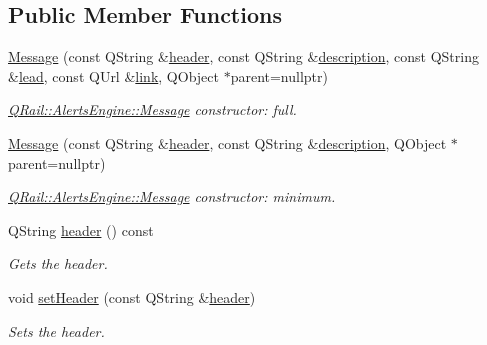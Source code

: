 \subsection*{Public Member Functions}
\begin{DoxyCompactItemize}
\item 
\mbox{\hyperlink{classQRail_1_1AlertsEngine_1_1Message_a9867f44f407fac012b4a29299dac9717}{Message}} (const Q\+String \&\mbox{\hyperlink{classQRail_1_1AlertsEngine_1_1Message_afa82f8ebbc074c3131254782a11c7414}{header}}, const Q\+String \&\mbox{\hyperlink{classQRail_1_1AlertsEngine_1_1Message_a0915a09de9f161ca15af08e198c3aef5}{description}}, const Q\+String \&\mbox{\hyperlink{classQRail_1_1AlertsEngine_1_1Message_a9dae467ea28e07e75d2b18f113516552}{lead}}, const Q\+Url \&\mbox{\hyperlink{classQRail_1_1AlertsEngine_1_1Message_a230424a1a57b9616ab6057cfa0d9aeba}{link}}, Q\+Object $\ast$parent=nullptr)
\begin{DoxyCompactList}\small\item\em \mbox{\hyperlink{classQRail_1_1AlertsEngine_1_1Message}{Q\+Rail\+::\+Alerts\+Engine\+::\+Message}} constructor\+: full. \end{DoxyCompactList}\item 
\mbox{\hyperlink{classQRail_1_1AlertsEngine_1_1Message_a453a2731f60a132e3e4bb39e08dbcf4c}{Message}} (const Q\+String \&\mbox{\hyperlink{classQRail_1_1AlertsEngine_1_1Message_afa82f8ebbc074c3131254782a11c7414}{header}}, const Q\+String \&\mbox{\hyperlink{classQRail_1_1AlertsEngine_1_1Message_a0915a09de9f161ca15af08e198c3aef5}{description}}, Q\+Object $\ast$parent=nullptr)
\begin{DoxyCompactList}\small\item\em \mbox{\hyperlink{classQRail_1_1AlertsEngine_1_1Message}{Q\+Rail\+::\+Alerts\+Engine\+::\+Message}} constructor\+: minimum. \end{DoxyCompactList}\item 
Q\+String \mbox{\hyperlink{classQRail_1_1AlertsEngine_1_1Message_afa82f8ebbc074c3131254782a11c7414}{header}} () const
\begin{DoxyCompactList}\small\item\em Gets the header. \end{DoxyCompactList}\item 
void \mbox{\hyperlink{classQRail_1_1AlertsEngine_1_1Message_af952ee41f2bd04126b5c73aa20c8fccc}{set\+Header}} (const Q\+String \&\mbox{\hyperlink{classQRail_1_1AlertsEngine_1_1Message_afa82f8ebbc074c3131254782a11c7414}{header}})
\begin{DoxyCompactList}\small\item\em Sets the header. \end{DoxyCompactList}\item 

\end{DoxyCompactItemize}
